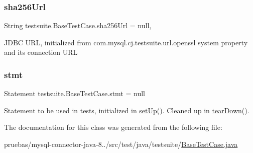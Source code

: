 \subsubsection{\texorpdfstring{sha256\+Url}{sha256Url}}
{\footnotesize\ttfamily String testsuite.\+Base\+Test\+Case.\+sha256\+Url = null\hspace{0.3cm}{\ttfamily [static]}, {\ttfamily [protected]}}

J\+D\+BC U\+RL, initialized from com.\+mysql.\+cj.\+testsuite.\+url.\+openssl system property and its connection U\+RL \mbox{\label{classtestsuite_1_1_base_test_case_a47db7db62d10e395144b1210dc7fd337}} 
\subsubsection{\texorpdfstring{stmt}{stmt}}
{\footnotesize\ttfamily Statement testsuite.\+Base\+Test\+Case.\+stmt = null\hspace{0.3cm}{\ttfamily [protected]}}

Statement to be used in tests, initialized in \mbox{\hyperlink{classtestsuite_1_1_base_test_case_a195f5d285c7979328734606d08ad15b1}{set\+Up()}}. Cleaned up in \mbox{\hyperlink{classtestsuite_1_1_base_test_case_a51c7d76ab24b0c966f956250fd7a4f52}{tear\+Down()}}. 

The documentation for this class was generated from the following file\+:\begin{DoxyCompactItemize}
\item 
pruebas/mysql-\/connector-\/java-\/8../src/test/java/testsuite/\mbox{\hyperlink{_base_test_case_8java}{Base\+Test\+Case.\+java}}\end{DoxyCompactItemize}
